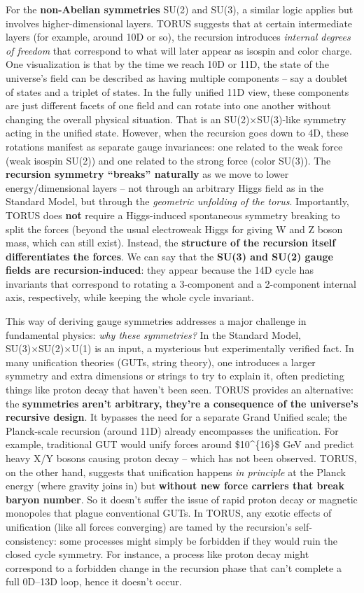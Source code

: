 For the \textbf{non-Abelian symmetries} SU(2) and SU(3), a similar logic
applies but involves higher-dimensional layers. TORUS suggests that at
certain intermediate layers (for example, around 10D or so), the
recursion introduces \emph{internal degrees of freedom} that correspond
to what will later appear as isospin and color charge​. One
visualization is that by the time we reach 10D or 11D, the state of the
universe's field can be described as having multiple components -- say a
doublet of states and a triplet of states. In the fully unified 11D
view, these components are just different facets of one field and can
rotate into one another without changing the overall physical situation.
That is an SU(2)×SU(3)-like symmetry acting in the unified state.
However, when the recursion goes down to 4D, these rotations manifest as
separate gauge invariances: one related to the weak force (weak isospin
SU(2)) and one related to the strong force (color SU(3)). The
\textbf{recursion symmetry ``breaks'' naturally} as we move to lower
energy/dimensional layers -- not through an arbitrary Higgs field as in
the Standard Model, but through the \emph{geometric unfolding of the
torus}. Importantly, TORUS does \textbf{not} require a Higgs-induced
spontaneous symmetry breaking to split the forces (beyond the usual
electroweak Higgs for giving W and Z boson mass, which can still exist).
Instead, the \textbf{structure of the recursion itself differentiates
the forces}​. We can say that the \textbf{SU(3) and SU(2) gauge fields
are recursion-induced}: they appear because the 14D cycle has invariants
that correspond to rotating a 3-component and a 2-component internal
axis, respectively, while keeping the whole cycle invariant.

This way of deriving gauge symmetries addresses a major challenge in
fundamental physics: \emph{why these symmetries?} In the Standard Model,
SU(3)×SU(2)×U(1) is an input, a mysterious but experimentally verified
fact. In many unification theories (GUTs, string theory), one introduces
a larger symmetry and extra dimensions or strings to try to explain it,
often predicting things like proton decay that haven't been seen. TORUS
provides an alternative: the \textbf{symmetries aren't arbitrary,
they're a consequence of the universe's recursive design}. It bypasses
the need for a separate Grand Unified scale; the Planck-scale recursion
(around 11D) already encompasses the unification​. For example,
traditional GUT would unify forces around \$10\^{}\{16\}\$ GeV and
predict heavy X/Y bosons causing proton decay -- which has not been
observed. TORUS, on the other hand, suggests that unification happens
\emph{in principle} at the Planck energy (where gravity joins in) but
\textbf{without new force carriers that break baryon number}. So it
doesn't suffer the issue of rapid proton decay or magnetic monopoles
that plague conventional GUTs​. In TORUS, any exotic effects of
unification (like all forces converging) are tamed by the recursion's
self-consistency: some processes might simply be forbidden if they would
ruin the closed cycle symmetry. For instance, a process like proton
decay might correspond to a forbidden change in the recursion phase that
can't complete a full 0D--13D loop, hence it doesn't occur.


